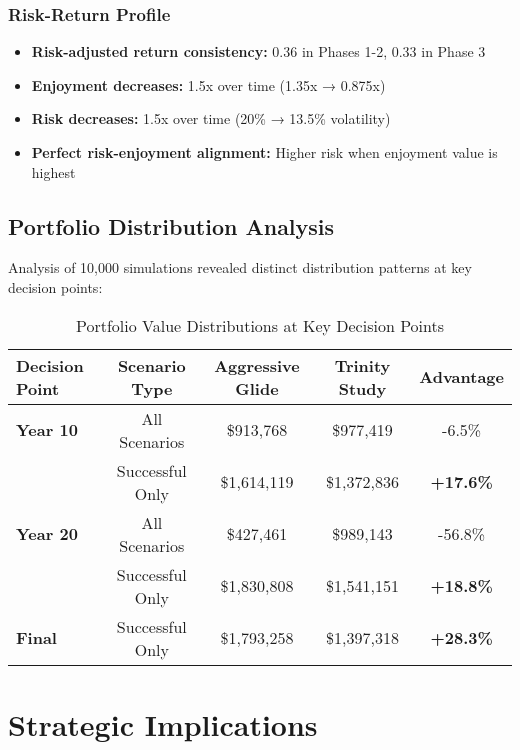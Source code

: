 \documentclass[11pt,letterpaper]{article}
\begin{document}
\subsubsection{Risk-Return Profile}
\begin{itemize}[leftmargin=*]
    \item \textbf{Risk-adjusted return consistency:} 0.36 in Phases 1-2, 0.33 in Phase 3
    \item \textbf{Enjoyment decreases:} 1.5x over time (1.35x → 0.875x)
    \item \textbf{Risk decreases:} 1.5x over time (20\% → 13.5\% volatility)
    \item \textbf{Perfect risk-enjoyment alignment:} Higher risk when enjoyment value is highest
\end{itemize}

\subsection{Portfolio Distribution Analysis}

Analysis of 10,000 simulations revealed distinct distribution patterns at key decision points:

\begin{table}[H]
\centering
\begin{tabular}{@{}lcccc@{}}
\toprule
\textbf{Decision Point} & \textbf{Scenario Type} & \textbf{Aggressive Glide} & \textbf{Trinity Study} & \textbf{Advantage} \\
\midrule
\textbf{Year 10} & All Scenarios & \$913,768 & \$977,419 & -6.5\% \\
& Successful Only & \$1,614,119 & \$1,372,836 & \textbf{+17.6\%} \\
\midrule
\textbf{Year 20} & All Scenarios & \$427,461 & \$989,143 & -56.8\% \\
& Successful Only & \$1,830,808 & \$1,541,151 & \textbf{+18.8\%} \\
\midrule
\textbf{Final} & Successful Only & \$1,793,258 & \$1,397,318 & \textbf{+28.3\%} \\
\bottomrule
\end{tabular}
\caption{Portfolio Value Distributions at Key Decision Points}
\label{tab:distributions}
\end{table}

\section{Strategic Implications}
\end{document}
